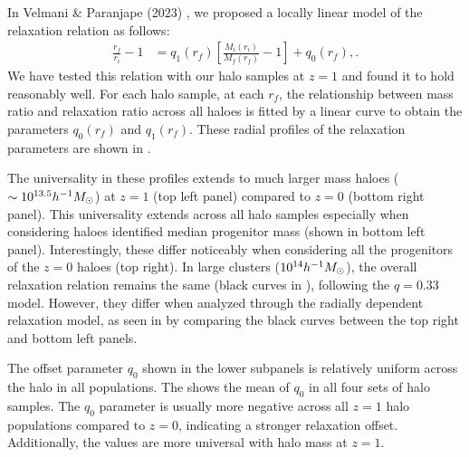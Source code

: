 \begin{figure}
\label{fig:fit-view-mass-indep}
\end{figure}

In Velmani \& Paranjape (2023) \cite{2023Velmani&Paranjape}, we proposed a locally linear model of the relaxation relation as follows:
\begin{align}
\label{eq:chi-linear-q0}
\frac{r_f}{r_i} - 1 &= q_1(r_f) \left[ \frac{M_i(r_i)}{M_f(r_f)} - 1 \right] + q_0(r_f),.
\end{align}
We have tested this relation with our halo samples at $z=1$ and found it to hold reasonably well. For each halo sample, at each $r_f$, the relationship between mass ratio and relaxation ratio across all haloes is fitted by a linear curve to obtain the parameters $q_0(r_f)$ and $q_1(r_f)$. These radial profiles of the relaxation parameters are shown in .

The universality in these profiles extends to much larger mass haloes ($\sim 10^{13.5} h^{-1}M_{\odot}$) at $z=1$ (top left panel) compared to $z=0$ (bottom right panel). This universality extends across all halo samples especially when considering haloes identified median progenitor mass (shown in bottom left panel). Interestingly, these differ noticeably when considering all the progenitors of the $z=0$ haloes (top right). In large clusters ($10^{14} h^{-1}M_{\odot}$), the overall relaxation relation remains the same (black curves in ), following the $q=0.33$ model. However, they differ when analyzed through the radially dependent relaxation model, as seen in  by comparing the black curves between the top right and bottom left panels.

The offset parameter $q_0$ shown in the lower subpanels is relatively uniform across the halo in all populations. The  shows the mean of $q_0$ in all four sets of halo samples. The $q_0$ parameter is usually more negative across all $z=1$ halo populations compared to $z=0$, indicating a stronger relaxation offset. Additionally, the values are more universal with halo mass at $z=1$.

